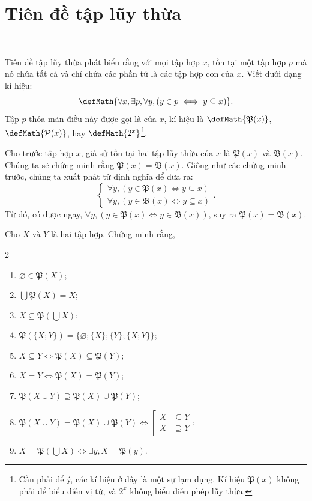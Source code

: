 \section{Tiên đề tập lũy thừa}

\

Tiên đề tập lũy thừa phát biểu rằng với mọi tập hợp $x$, tồn tại một tập hợp $p$ mà nó chứa tất cả và chỉ chứa các phần tử là các tập hợp con của $x$. Viết dưới dạng kí hiệu:
\begin{equation*}
    \defMath{\forall x, \exists p, \forall y, \left( y \in p \iff y \subseteq x \right)}.
\end{equation*}
Tập $p$ thỏa mãn điều này được gọi là  của $x$, kí hiệu là $\defMath{\mathfrak{P}(x)}$, $\defMath{\mathcal{P}(x)}$, hay $\defMath{2^x}$\footnote{Cần phải để ý, các kí hiệu ở đây là một sự lạm dụng. Kí hiệu $\mathfrak{P}(x)$ không phải để biểu diễn vị từ, và $2^x$ không biểu diễn phép lũy thừa.}.

Cho trước tập hợp $x$, giả sử tồn tại hai tập lũy thừa của $x$ là $\mathfrak{P}(x)$ và $\mathfrak{B}(x)$. Chúng ta sẽ chứng minh rằng $\mathfrak{P}(x) = \mathfrak{B}(x)$. Giống như các chứng minh trước, chúng ta xuất phát từ định nghĩa để đưa ra:
\begin{equation*}
    \begin{cases}
        \forall y, \left( y \in \mathfrak{P}(x) \iff y \subseteq x \right) \\
        \forall y, \left( y \in \mathfrak{B}(x) \iff y \subseteq x \right)
    \end{cases}.
\end{equation*}
Từ đó, có được ngay, $\forall y, (y \in \mathfrak{P}(x) \iff y \in \mathfrak{B}(x))$, suy ra $\mathfrak{P}(x) = \mathfrak{B}(x)$.

\exercise Cho $X$ và $Y$ là hai tập hợp. Chứng minh rằng,
\begin{multicols}{2}
   \begin{enumerate}
      \item $\varnothing \in \mathfrak{P}(X)$;
      \item $\bigcup \mathfrak{P}(X) = X$;
      \item $X \subseteq \mathfrak{P}\left(\bigcup X\right)$;
      \item $\mathfrak{P}(\{X; Y\}) = \{\varnothing; \{X\}; \{Y\}; \{X; Y\}\}$;
      \item $X \subseteq Y \iff \mathfrak{P}(X) \subseteq \mathfrak{P}(Y)$;
      \item $X = Y \iff \mathfrak{P}(X) = \mathfrak{P}(Y)$;
      \item $\mathfrak{P}(X \cup Y) \supseteq \mathfrak{P}(X) \cup \mathfrak{P}(Y)$;
      \item $\mathfrak{P}(X \cup Y) = \mathfrak{P}(X) \cup \mathfrak{P}(Y) \iff \left[\begin{aligned}
         X &\subseteq Y \\ 
         X &\supseteq Y
      \end{aligned}\right.$;
      \item $X = \mathfrak{P}\left(\bigcup X\right) \iff \exists y, X = \mathfrak{P}(y)$.
   \end{enumerate}
\end{multicols}

